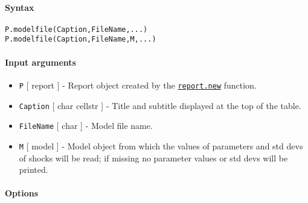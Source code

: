 


	\paragraph{Syntax}\label{syntax}

\begin{verbatim}
P.modelfile(Caption,FileName,...)
P.modelfile(Caption,FileName,M,...)
\end{verbatim}

\paragraph{Input arguments}\label{input-arguments}

\begin{itemize}
\item
  \texttt{P} {[} report {]} - Report object created by the
  \href{report/new}{\texttt{report.new}} function.
\item
  \texttt{Caption} {[} char \textbar{} cellstr {]} - Title and subtitle
  displayed at the top of the table.
\item
  \texttt{FileName} {[} char {]} - Model file name.
\item
  \texttt{M} {[} model {]} - Model object from which the values of
  parameters and std devs of shocks will be read; if missing no
  parameter values or std devs will be printed.
\end{itemize}

\paragraph{Options}\label{options}


